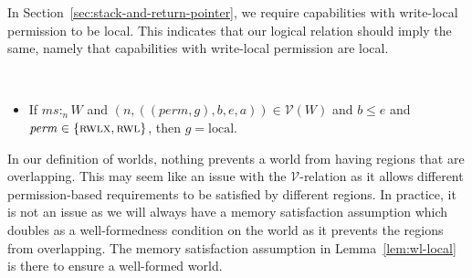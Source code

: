 \documentclass[format=acmsmall, review=true, screen=true]{acmart}
\renewcommand{\sectionname}{Section}
\newcommand{\var}[1]{\mathit{#1}}
\newcommand{\hs}{\var{ms}}
\newcommand{\ms}{\hs}
\newcommand{\gl}{\var{g}}
\newcommand{\addr}{\var{a}}
\newcommand{\start}{\var{b}}
\newcommand{\addrend}{\var{e}}
\newcommand{\heap}{\var{mem}}
\newcommand{\perm}{\var{perm}}
\newcommand{\stdcap}[1][(\perm,\gl)]{\left(#1,\start,\addrend,\addr \right)}
\newcommand{\heapSat}[3][\heap]{#1 :_{#2} #3}
\newcommand{\memSat}[3][n]{\heapSat[#2]{#1}{#3}}
\newcommand{\asmType}{\plaindom{AsmType}}
\newcommand{\plaindom}[1]{\mathrm{#1}}
\newcommand{\intr}[2]{\mathcal{#1}}
\newcommand{\valueintr}[1]{\intr{V}{#1}}
\newcommand{\stdvr}{\valueintr{\asmType}}
\newcommand{\npair}[2][n]{\left(#1,#2 \right)}
\newcommand{\plainperm}[1]{\textsc{#1}}
\newcommand{\readwritel}{\plainperm{rwl}}
\newcommand{\rwl}{\readwritel}
\newcommand{\rwlx}{\plainperm{rwlx}}
\newcommand{\plainlocality}[1]{\mathrm{#1}}
\newcommand{\local}{\plainlocality{local}}
\newenvironment{toplas}{}{}
\begin{document}
\begin{toplas}
  In \sectionname~\ref{sec:stack-and-return-pointer}, we require capabilities with write-local permission to be local.
  This indicates that our logical relation should imply the same, namely that capabilities with write-local permission are local.
  \begin{lemma}~
    \label{lem:wl-local}
    \begin{itemize}
    \item If $\memSat{\ms}{W}$ and $\npair{\stdcap} \in \stdvr(W)$ and $\start
      \leq \addrend$ and $\perm \in \{\rwlx,\rwl\}$, then $\gl = \local$.
    \end{itemize}
  \end{lemma}
  In our definition of worlds, nothing prevents a world from having regions that are overlapping.
  This may seem like an issue with the $\stdvr$-relation as it allows different permission-based requirements to be satisfied by different regions.
  In practice, it is not an issue as we will always have a memory satisfaction assumption which doubles as a well-formedness condition on the world as it prevents the regions from overlapping.
  The memory satisfaction assumption in Lemma~\ref{lem:wl-local} is there to ensure a well-formed world.
\end{toplas}
\end{document}
